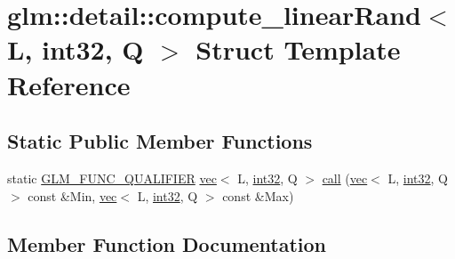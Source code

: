 \hypertarget{structglm_1_1detail_1_1compute__linear_rand_3_01_l_00_01int32_00_01_q_01_4}{}\section{glm\+:\+:detail\+:\+:compute\+\_\+linear\+Rand$<$ L, int32, Q $>$ Struct Template Reference}
\label{structglm_1_1detail_1_1compute__linear_rand_3_01_l_00_01int32_00_01_q_01_4}
\subsection*{Static Public Member Functions}
\begin{DoxyCompactItemize}
\item 
static \hyperlink{setup_8hpp_a33fdea6f91c5f834105f7415e2a64407}{G\+L\+M\+\_\+\+F\+U\+N\+C\+\_\+\+Q\+U\+A\+L\+I\+F\+I\+ER} \hyperlink{structglm_1_1vec}{vec}$<$ L, \hyperlink{namespaceglm_1_1detail_a9f85b4efeca416cdcec2fd08939a2e17}{int32}, Q $>$ \hyperlink{structglm_1_1detail_1_1compute__linear_rand_3_01_l_00_01int32_00_01_q_01_4_a6189fc7b1f62fe6c2c046bb5374ffa2a}{call} (\hyperlink{structglm_1_1vec}{vec}$<$ L, \hyperlink{namespaceglm_1_1detail_a9f85b4efeca416cdcec2fd08939a2e17}{int32}, Q $>$ const \&Min, \hyperlink{structglm_1_1vec}{vec}$<$ L, \hyperlink{namespaceglm_1_1detail_a9f85b4efeca416cdcec2fd08939a2e17}{int32}, Q $>$ const \&Max)
\end{DoxyCompactItemize}


\subsection{Member Function Documentation}
\mbox{\label{structglm_1_1detail_1_1compute__linear_rand_3_01_l_00_01int32_00_01_q_01_4_a6189fc7b1f62fe6c2c046bb5374ffa2a}} 
